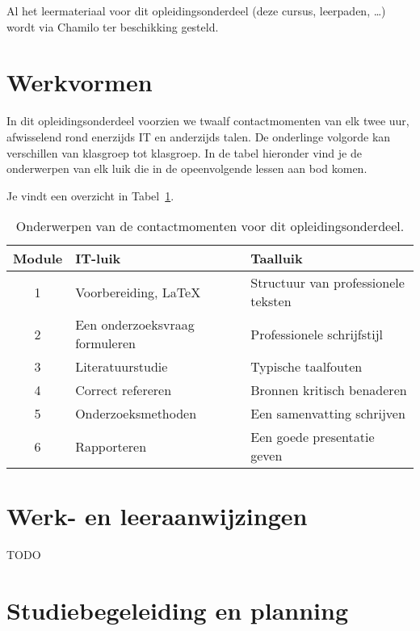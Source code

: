 Al het leermateriaal voor dit opleidingsonderdeel (deze cursus, leerpaden, \ldots) wordt via Chamilo ter beschikking gesteld.

\section{Werkvormen}%
\label{sec:werkvormen}

In dit opleidingsonderdeel voorzien we twaalf contactmomenten van elk twee uur, afwisselend rond enerzijds IT en anderzijds talen. De onderlinge volgorde kan verschillen van klasgroep tot klasgroep. In de tabel hieronder vind je de onderwerpen van elk luik die in de opeenvolgende lessen aan bod komen.

Je vindt een overzicht in Tabel~\ref{tab:planning}.

\begin{table}
  \centering\begin{tabular}{cll}
    \toprule
    \textbf{Module} & \textbf{IT-luik}               & \textbf{Taalluik}                   \\
    \midrule
    1               & Voorbereiding, {\LaTeX}        & Structuur van professionele teksten \\
    2               & Een onderzoeksvraag formuleren & Professionele schrijfstijl          \\
    3               & Literatuurstudie               & Typische taalfouten                 \\
    4               & Correct refereren              & Bronnen kritisch benaderen          \\
    5               & Onderzoeksmethoden             & Een samenvatting schrijven          \\
    6               & Rapporteren                    & Een goede presentatie geven         \\
  \end{tabular}
  \caption{\label{tab:planning}Onderwerpen van de contactmomenten voor dit opleidingsonderdeel.}
\end{table}

\section{Werk- en leeraanwijzingen}%
\label{sec:werk-en-leeraanwijzingen}

TODO

\section{Studiebegeleiding en planning}%
\label{sec:studiebegeleiding-en-planning}

